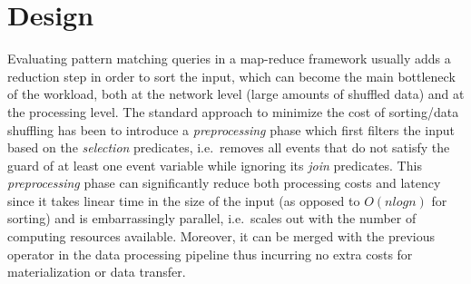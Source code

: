 \section{Design}
\label{sec:design}

Evaluating pattern matching queries in a map-reduce framework usually 
adds a reduction step in order to sort the input, which can become the main 
bottleneck of the workload, both at the network level (large amounts of 
shuffled data) and at the processing level.
The standard approach to minimize the cost of sorting/data shuffling has been 
to introduce a {\em preprocessing} phase which first filters the input based on 
the {\em selection} predicates, i.e.\ removes all events that do not satisfy 
the guard of at least one event variable while ignoring its {\em join} 
predicates.
This {\em preprocessing} phase can significantly reduce both processing costs 
and latency since it takes linear time in the size of the input (as opposed to 
$O(nlogn)$ for sorting) and is embarrassingly parallel, i.e.\ scales out with 
the number of computing resources available.
Moreover, it can be merged with the previous operator in the data processing 
pipeline thus incurring no extra costs for materialization or data transfer.    



